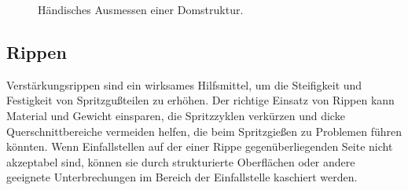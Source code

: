 \begin{figure}[ht]
    \centering 
\caption{H\"andisches Ausmessen einer Domstruktur.} 
\label{im:domes}
\end{figure} 

\subsection{Rippen}
\label{rips}

Verst\"arkungsrippen sind ein wirksames Hilfsmittel, um die Steifigkeit und Festigkeit von Spritzgu{\ss}teilen zu erhöhen.
Der richtige Einsatz von Rippen kann Material und Gewicht einsparen, die Spritzzyklen verkürzen und dicke Querschnittbereiche vermeiden helfen, die beim Spritzgie{\ss}en zu Problemen führen könnten. Wenn Einfallstellen auf der einer Rippe
gegen\"uberliegenden Seite nicht akzeptabel sind, k\"onnen sie durch strukturierte Oberflächen oder andere geeignete Unterbrechungen im Bereich der Einfallstelle kaschiert werden.

